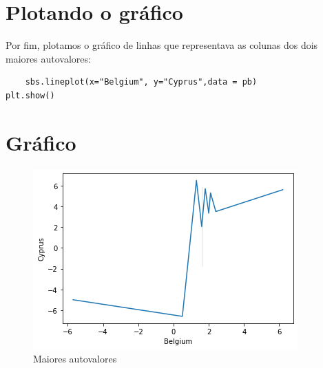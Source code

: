\documentclass{article}
\begin{document}
\section{Plotando o gráfico}
Por fim, plotamos o gráfico de linhas que representava as colunas dos dois maiores autovalores:
\begin{verbatim}
    sbs.lineplot(x="Belgium", y="Cyprus",data = pb)
plt.show()
\end{verbatim}
\hline
\section{Gráfico}
\begin{figure}
    \centering
    \includegraphics{figs/graphic.png}
    \caption{Maiores autovalores}
    \label{fig:my_label}
\end{figure}
\end{document}
